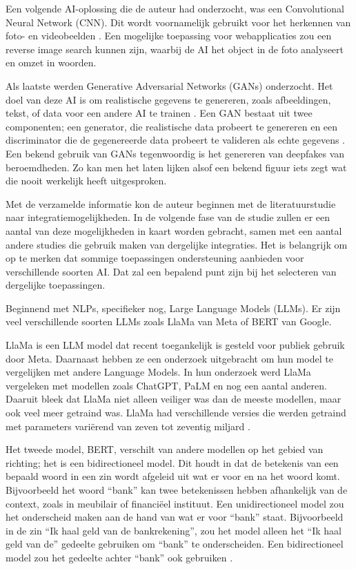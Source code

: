 \documentclass[dutch]{hogent-article}
\begin{document}
Een volgende AI-oplossing die de auteur had onderzocht, was een Convolutional Neural Network (CNN). Dit wordt voornamelijk gebruikt voor het herkennen van foto- en videobeelden \autocite{IBMCNN2023}. Een mogelijke toepassing voor webapplicaties zou een reverse image search kunnen zijn, waarbij de AI het object in de foto analyseert en omzet in woorden.

Als laatste werden Generative Adversarial Networks (GANs) onderzocht. Het doel van deze AI is om realistische gegevens te genereren, zoals afbeeldingen, tekst, of data voor een andere AI te trainen \autocite{Goodfellow2020}. Een GAN bestaat uit twee componenten; een generator, die realistische data probeert te genereren en een discriminator die de gegenereerde data probeert te valideren als echte gegevens \autocite{Goodfellow2020}. Een bekend gebruik van GANs tegenwoordig is het genereren van deepfakes van beroemdheden. Zo kan men het laten lijken alsof een bekend figuur iets zegt wat die nooit werkelijk heeft uitgesproken.

Met de verzamelde informatie kon de auteur beginnen met de literatuurstudie naar integratiemogelijkheden. In de volgende fase van de studie zullen er een aantal van deze mogelijkheden in kaart worden gebracht, samen met een aantal andere studies die gebruik maken van dergelijke integraties. Het is belangrijk om op te merken dat sommige toepassingen ondersteuning aanbieden voor verschillende soorten AI. Dat zal een bepalend punt zijn bij het selecteren van dergelijke toepassingen.

Beginnend met NLPs, specifieker nog, Large Language Models (LLMs). Er zijn veel verschillende soorten LLMs zoals LlaMa van Meta of BERT van Google. 

LlaMa is een LLM model dat recent toegankelijk is gesteld voor publiek gebruik door Meta. Daarnaast hebben ze een onderzoek uitgebracht om hun model te vergelijken met andere Language Models. In hun onderzoek werd LlaMa vergeleken met modellen zoals ChatGPT, PaLM en nog een aantal anderen. Daaruit bleek dat LlaMa niet alleen veiliger was dan de meeste modellen, maar ook veel meer getraind was. LlaMa had verschillende versies die werden getraind met parameters variërend van zeven tot zeventig miljard \autocite{Touvron2023Llama2O}.

Het tweede model, BERT, verschilt van andere modellen op het gebied van richting; het is een bidirectioneel model. Dit houdt in dat de betekenis van een bepaald woord in een zin wordt afgeleid uit wat er voor en na het woord komt. Bijvoorbeeld het woord “bank” kan twee betekenissen hebben afhankelijk van de context, zoals in meubilair of financiëel instituut. Een unidirectioneel model zou het onderscheid maken aan de hand van wat er voor “bank” staat. Bijvoorbeeld in de zin “Ik haal geld van de bankrekening”, zou het model alleen het “Ik haal geld van de” gedeelte gebruiken om “bank” te onderscheiden. Een bidirectioneel model zou het gedeelte achter “bank” ook gebruiken \autocite{Devlin2018}.
\end{document}
